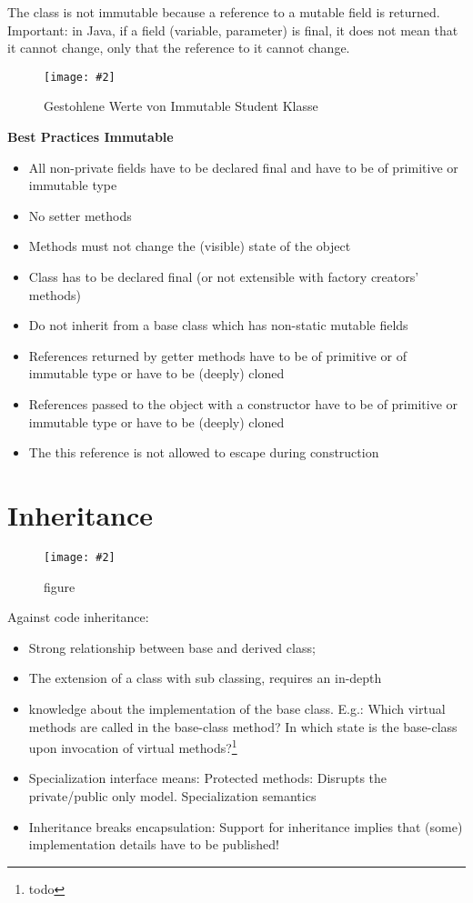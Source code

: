 \documentclass[a4paper,10pt]{scrreprt}
\newcommand{\pic}[2][figure]{\begin{figure}[h]
 \centering
 \texttt{[image: \#2]}
 \caption{#1}
\end{figure}
}
\begin{document}
\begin{framed}
 The class is not immutable because a reference to a mutable field is returned.
Important: in Java, if a field (variable, parameter) is final, it does not mean that it
cannot change, only that the reference to it cannot change.
\end{framed}
\pic[Gestohlene Werte von Immutable Student Klasse]{gestst.png}
\textbf{Best Practices Immutable} 
\begin{itemize}
\item All non-private fields have to be declared final and have to be of
primitive or immutable type
\item No setter methods
\item Methods must not change the (visible) state of the object
\item Class has to be declared final (or not extensible with factory
creators’ methods)
\item Do not inherit from a base class which has non-static mutable fields
\item References returned by getter methods have to be of primitive or of
immutable type or have to be (deeply) cloned
\item References passed to the object with a constructor have to be of
primitive or immutable type or have to be (deeply) cloned
\item The this reference is not allowed to escape during construction
\end{itemize}

\section{Inheritance}
\pic{scsh.png}
 Against code inheritance:
\begin{itemize}

\item Strong relationship between base and derived class;
\item  The extension of a class with sub classing, requires an in-depth
\item knowledge about the implementation of the base class. E.g.:
\subitem  Which virtual methods are called in the base-class method?
\subitem In which state is the base-class upon invocation of virtual methods?\footnote{todo}
\item  Specialization interface means:
\subitem Protected methods: Disrupts the private/public only model.
\subitem Specialization semantics
\item Inheritance breaks encapsulation:
\subitem Support for inheritance implies that (some) implementation details have
to be published!
\end{itemize}
\end{document}
